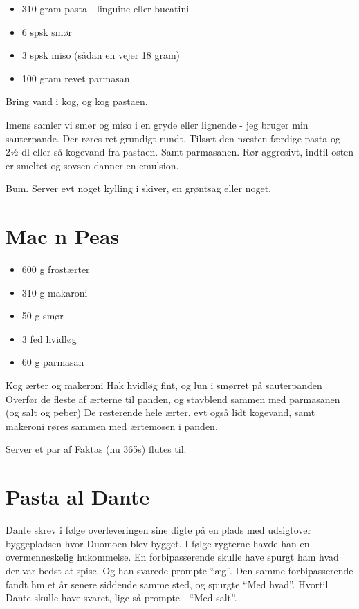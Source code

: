\documentclass[
]{book}
\providecommand{\tightlist}{%
  \setlength{\itemsep}{0pt}\setlength{\parskip}{0pt}}
\begin{document}
\begin{itemize}
\tightlist
\item
  310 gram pasta - linguine eller bucatini
\item
  6 spsk smør
\item
  3 spsk miso (sådan en vejer 18 gram)
\item
  100 gram revet parmasan
\end{itemize}

Bring vand i kog, og kog pastaen.

Imens samler vi smør og miso i en gryde eller lignende - jeg
bruger min sauterpande. Der røres ret grundigt rundt.
Tilsæt den næsten færdige pasta og 2½ dl eller så kogevand
fra pastaen. Samt parmasanen. Rør aggresivt, indtil
osten er smeltet og sovsen danner en emulsion.

Bum. Server evt noget kylling i skiver, en grøntsag eller noget.

\section{Mac n Peas}\label{mac-n-peas}

\begin{itemize}
\tightlist
\item
  600 g frostærter
\item
  310 g makaroni
\item
  50 g smør
\item
  3 fed hvidløg
\item
  60 g parmasan
\end{itemize}

Kog ærter og makeroni
Hak hvidløg fint, og lun i smørret på sauterpanden
Overfør de fleste af ærterne til panden, og stavblend sammen med parmasanen (og salt og peber)
De resterende hele ærter, evt også lidt kogevand, samt makeroni røres sammen med ærtemosen i panden.

Server et par af Faktas (nu 365s) flutes til.

\section{Pasta al Dante}\label{pasta-al-dante}

Dante skrev i følge overleveringen sine digte på en plads med udsigtover byggepladsen hvor Duomoen blev bygget. I følge rygterne havde han en overmenneskelig hukommelse.
En forbipasserende skulle have spurgt ham hvad der var bedst at spise. Og han svarede prompte ``æg''. Den samme forbipasserende fandt hm et år senere siddende samme sted, og spurgte ``Med hvad''. Hvortil Dante skulle have svaret, lige så prompte - ``Med salt''.
\end{document}
